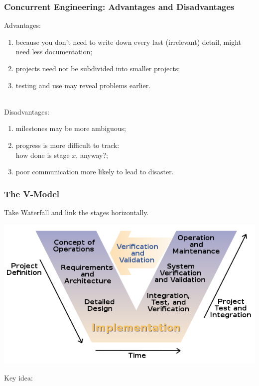 \begin{frame}
\frametitle{Concurrent Engineering: Advantages and Disadvantages}
\begin{changemargin}{1cm}
Advantages: 
\begin{enumerate}
\item because you don't need to write down every last
  (irrelevant) detail, might need less documentation; 
\item projects need not be subdivided into smaller projects; 
\item testing and use may reveal problems earlier.
\end{enumerate}
~\\[1em]
Disadvantages: 
\begin{enumerate}
\item milestones may be more ambiguous; 
\item progress is more difficult to track: \\
\qquad how done is stage $x$, anyway?; 
\item poor
  communication more likely to lead to disaster.
\end{enumerate}


\end{changemargin}
\end{frame}

\begin{frame}
\frametitle{The V-Model}

\begin{changemargin}{1cm}
Take Waterfall and link the stages horizontally.

\begin{center}
\includegraphics[height=.5\textheight]{images/vmodel.png}
\end{center}

Key idea: 
\end{changemargin}
\end{frame}

